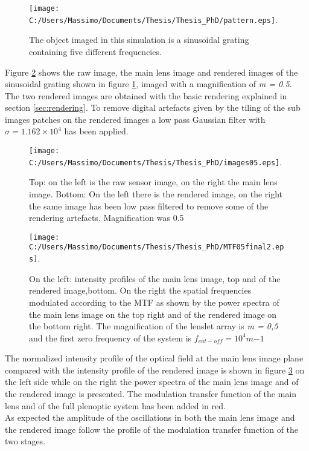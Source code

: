 \begin{figure}[H]
	\centering
	\texttt{[image: C:/Users/Massimo/Documents/Thesis/Thesis\_PhD/pattern.eps]}.
	\caption{\label{fig:pattern} The object imaged in this simulation is a sinusoidal grating containing five different frequencies. }
\end{figure}
Figure \ref{fig:image05} shows the raw image, the main lens image and rendered images of the sinusoidal grating shown in figure \ref{fig:pattern}, imaged with a magnification of \textit{m = 0.5}. The two rendered images are obtained with the basic rendering explained in section \ref{sec:rendering}. To remove digital artefacts given by the tiling of the sub images patches on the rendered images a low pass Gaussian filter with $\sigma = 1.162\times 10^4 $ has been applied.   
\begin{figure}[H]
	\centering
	\texttt{[image: C:/Users/Massimo/Documents/Thesis/Thesis\_PhD/images05.eps]}.
	\caption{\label{fig:image05} Top: on the left is the raw sensor image, on the right the main lens image. Bottom: On the left there is the  rendered image, on the right the same image has been low pass filtered to remove some of the rendering artefacts. Magnification was 0.5   }
\end{figure}
\begin{figure}[H]
	\centering
	\texttt{[image: C:/Users/Massimo/Documents/Thesis/Thesis\_PhD/MTF05final2.eps]}.
	\caption{\label{fig:freq05}  On the left: intensity profiles of the main lens image, top and of the rendered image,bottom. On the right the spatial frequencies modulated according to the MTF as shown by the power spectra of the main lens image on the top right and of the rendered image on the bottom right. The magnification of the lenslet array is \textit{m = 0,5} and  the first zero frequency of the system is $f_{cut-off} = 10^4 m{-1}$}
\end{figure}
The normalized intensity profile of the optical field at the main lens image plane compared with the intensity profile of the rendered image is shown in figure \ref{fig:freq05}  on the left side while on the right the power spectra of the main lens image and of the rendered image is presented. The modulation transfer function of the main lens and of the full plenoptic system has been added in red.  \\
As expected the amplitude of the oscillations in both the main lens image and the rendered image follow the profile of the modulation transfer function of the two stages.  \\
